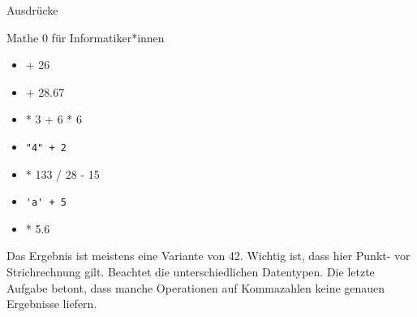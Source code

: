 \begin{task}[points=auto]{Ausdrücke }
\begin{subtask*}[points=0]{Mathe 0 für Informatiker*innen}
        \begin{multicols}{3}
            \begin{itemize}
                \item { + 26}
                \item { + 28.67}
                \item { * 3 + 6 * 6}
                \item {\ttfamily \verb="4" + 2=}
                \item { * 133 / 28 - 15}
                \item {\ttfamily \verb='a' + 5=}
                \item { * 5.6}
            \end{itemize}
        \end{multicols}


        \begin{solution}
            Das Ergebnis ist meistens eine Variante von 42.
            Wichtig ist, dass hier Punkt- vor Strichrechnung gilt.
            Beachtet die unterschiedlichen Datentypen.
            Die letzte Aufgabe betont, dass manche Operationen auf Kommazahlen keine genauen Ergebnisse liefern.
        \end{solution}
    \end{subtask*}
\end{task}

